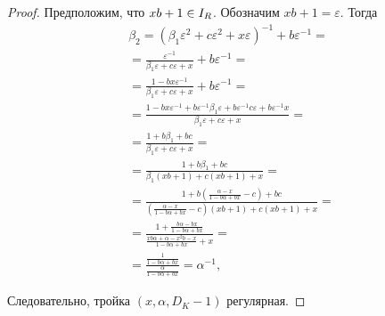 \documentclass[_00_dissertation.tex]{subfiles}
\begin{document}
\begin{proof}
    Предположим, что $xb + 1 \in I_{R}$.
    Обозначим $xb + 1 = \varepsilon$.
    Тогда
    \begin{equation*}
        \begin{split}
            \beta_2 = \left(
                \beta_1 \varepsilon^2 + c\varepsilon^2 + x\varepsilon
            \right)^{-1} + b\varepsilon^{-1} = \\
            = \frac{\varepsilon^{-1}}{\beta_1 \varepsilon + c\varepsilon + x} + b\varepsilon^{-1} = \\
            = \frac{1 - bx\varepsilon^{-1}}{\beta_1 \varepsilon + c\varepsilon + x} + b\varepsilon^{-1} = \\
            = \frac{1 - bx\varepsilon^{-1} + b\varepsilon^{-1}\beta_1 \varepsilon + b\varepsilon^{-1}c\varepsilon + b\varepsilon^{-1}x}{\beta_1 \varepsilon + c\varepsilon + x} = \\
            = \frac{1 + b\beta_1 + bc}{\beta_1 \varepsilon + c\varepsilon + x} = \\
            = \frac{1 + b\beta_1 + bc}{\beta_1(xb + 1) + c(xb + 1) + x} = \\
            = \frac{
                1 + b\left(
                    \frac{\alpha - x}{1 - b\alpha + bx} - c
                \right) + bc
            }{
                \left(
                    \frac{\alpha - x}{1 - b\alpha + bx} - c
                \right)(xb + 1) + c(xb + 1) + x
            } = \\
            = \frac{
                1 + \frac{b\alpha - bx}{1 - b\alpha + bx}
            }{
                \frac{xb\alpha + \alpha - x^2b - x}{1 - b\alpha + bx} + x
            } = \\
            = \frac{
                \frac{1}{1 - b\alpha + bx}
            }{
                \frac{\alpha}{1 - b\alpha + bx}
            } = \alpha^{-1},
        \end{split}
    \end{equation*}
    
    Следовательно, тройка $(x, \alpha, D_K - 1)$ регулярная.
\end{proof}
\end{document}
